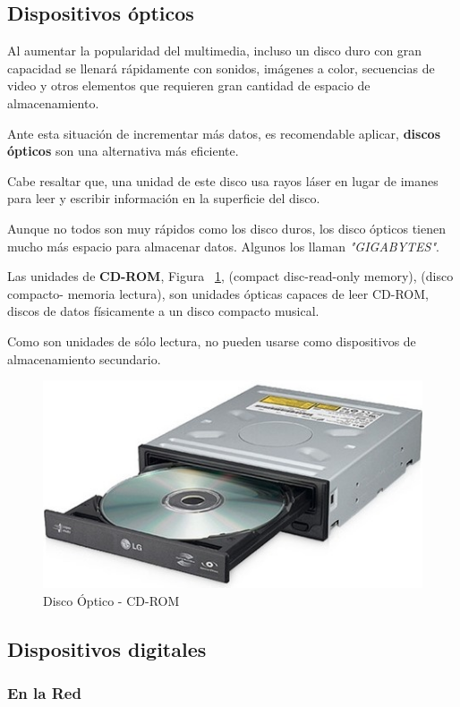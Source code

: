 \documentclass[10pt,journal]{IEEEtran}
\begin{document}
    \subsection{\textbf{Dispositivos ópticos}}
    
    Al aumentar la popularidad del multimedia, incluso un disco duro con gran capacidad
    se llenará rápidamente con sonidos, imágenes a color, secuencias de video y otros elementos que requieren gran cantidad de espacio de almacenamiento.
    
    Ante esta situación de incrementar más datos, es recomendable aplicar, \textbf{discos ópticos} son una alternativa más eficiente\cite{george1999introduccion}.
    
    Cabe resaltar que, una unidad de este disco usa rayos láser en lugar de imanes para leer y escribir información en la superficie del disco.
    
    Aunque no todos son muy rápidos como los disco duros, los disco ópticos tienen mucho más espacio para almacenar datos. Algunos los llaman \textit{"GIGABYTES"}.
    
    Las unidades de \textbf{CD-ROM}, Figura ~\ref{f3}, (compact disc-read-only memory), (disco compacto- memoria lectura), son unidades ópticas capaces de leer CD-ROM, discos de datos físicamente a un disco compacto musical.
    
    Como son unidades de sólo lectura, no pueden usarse como dispositivos de almacenamiento secundario.
    
    \begin{figure}[H]
        \begin{center}
            \includegraphics[width=0.3 \textwidth]{cd-rom.jpg}
            \caption{Disco Óptico - CD-ROM}
            \label{f3} 
        \end{center}
    \end{figure}

    \subsection{\textbf{Dispositivos digitales}}
    
    \subsubsection{\textbf{En la Red}}
    
\end{document}
